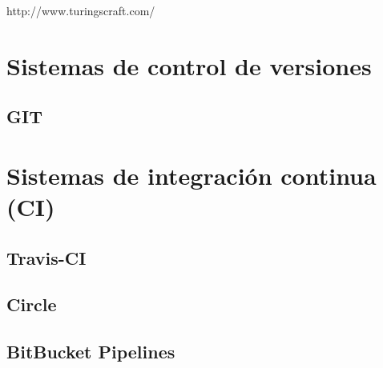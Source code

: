 http://www.turingscraft.com/


\section {Sistemas de control de versiones}

\subsection {GIT}

\section {Sistemas de integración continua (CI)}

\subsection {Travis-CI}

\subsection {Circle}

\subsection {BitBucket Pipelines}

